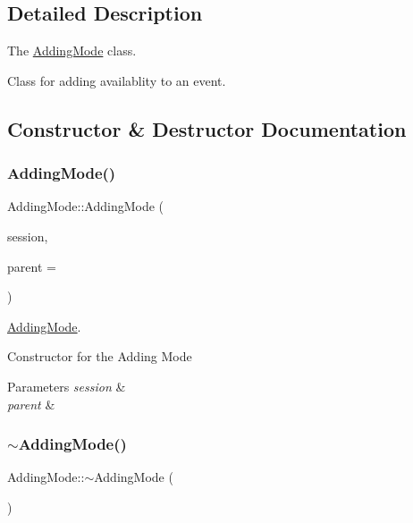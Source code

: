\subsection{Detailed Description}
The \hyperlink{class_adding_mode}{Adding\+Mode} class. 

Class for adding availablity to an event. 

\subsection{Constructor \& Destructor Documentation}
\mbox{\label{class_adding_mode_aa8830870d671f8d806bedd0ecf03d065}} 
\subsubsection{\texorpdfstring{Adding\+Mode()}{AddingMode()}}
{\footnotesize\ttfamily Adding\+Mode\+::\+Adding\+Mode (\begin{DoxyParamCaption}\item[{\hyperlink{class_session}{Session} $\ast$}]{session,  }\item[{Q\+Widget $\ast$}]{parent = {} }\end{DoxyParamCaption})\hspace{0.3cm}{\ttfamily [explicit]}}



\hyperlink{class_adding_mode}{Adding\+Mode}. 

Constructor for the Adding Mode 
\begin{DoxyParams}{Parameters}
{\em session} & \\
\hline
{\em parent} & \\
\hline
\end{DoxyParams}
\mbox{\label{class_adding_mode_a7006861b4a358f4cdc704bcfe15e5a7a}} 
\subsubsection{\texorpdfstring{$\sim$\+Adding\+Mode()}{~AddingMode()}}
{\footnotesize\ttfamily Adding\+Mode\+::$\sim$\+Adding\+Mode (\begin{DoxyParamCaption}{ }\end{DoxyParamCaption})}



